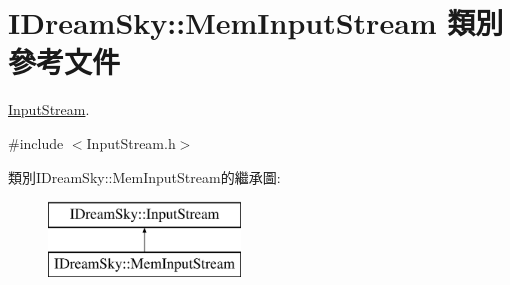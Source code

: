 \hypertarget{class_i_dream_sky_1_1_mem_input_stream}{}\section{I\+Dream\+Sky\+:\+:Mem\+Input\+Stream 類別 參考文件}
\label{class_i_dream_sky_1_1_mem_input_stream}


\hyperlink{class_i_dream_sky_1_1_input_stream}{Input\+Stream}.  




{\ttfamily \#include $<$Input\+Stream.\+h$>$}

類別\+I\+Dream\+Sky\+:\+:Mem\+Input\+Stream的繼承圖\+:\begin{figure}[H]
\begin{center}
\leavevmode
\includegraphics[height=2.000000cm]{class_i_dream_sky_1_1_mem_input_stream}
\end{center}
\end{figure}
